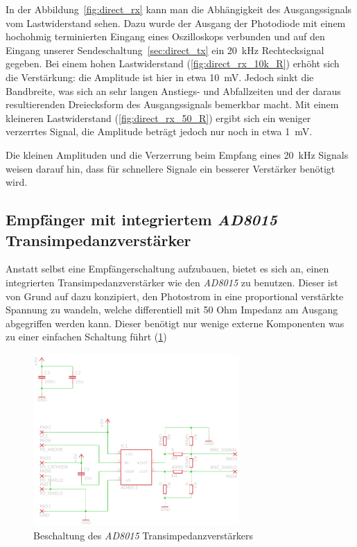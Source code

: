\documentclass[12pt,a4paper]{article}
\begin{document}
In der Abbildung~\ref{fig:direct_rx} kann man die Abhängigkeit des Ausgangssignals vom Lastwiderstand sehen. Dazu wurde der Ausgang der Photodiode mit einem hochohmig terminierten Eingang eines Oszilloskops verbunden und auf den Eingang unserer Sendeschaltung~\ref{sec:direct_tx} ein \SI{20}{\kilo\hertz} Rechtecksignal gegeben. Bei einem hohen Lastwiderstand (\ref{fig:direct_rx_10k_R}) erhöht sich die Verstärkung: die Amplitude ist hier in etwa \SI{10}{\milli\volt}. Jedoch sinkt die Bandbreite, was sich an sehr langen Anstiegs- und Abfallzeiten und der daraus resultierenden Dreiecksform des Ausgangssignals bemerkbar macht. Mit einem kleineren Lastwiderstand (\ref{fig:direct_rx_50_R}) ergibt sich ein weniger verzerrtes Signal, die Amplitude beträgt jedoch nur noch in etwa \SI{1}{\milli\volt}.

Die kleinen Amplituden und die Verzerrung beim Empfang eines \SI{20}{\kilo\hertz} Signals weisen darauf hin, dass für schnellere Signale ein besserer Verstärker benötigt wird.

\subsection{Empfänger mit integriertem \textit{AD8015} Transimpedanzverstärker}
Anstatt selbst eine Empfängerschaltung aufzubauen, bietet es sich an, einen integrierten Transimpedanzverstärker wie den \textit{AD8015} zu benutzen. Dieser ist von Grund auf dazu konzipiert, den Photostrom in eine proportional verstärkte Spannung zu wandeln, welche differentiell mit 50 Ohm Impedanz am Ausgang abgegriffen werden kann. Dieser benötigt nur wenige externe Komponenten was zu einer einfachen Schaltung führt (\ref{fig:receiver_sch})


\begin{figure}[h]
  \centering
    \includegraphics[width=0.7\textwidth]{img/receiver.pdf}
  \caption{Beschaltung des \textit{AD8015} Transimpedanzverstärkers}
  \label{fig:receiver_sch}
\end{figure}
\end{document}
